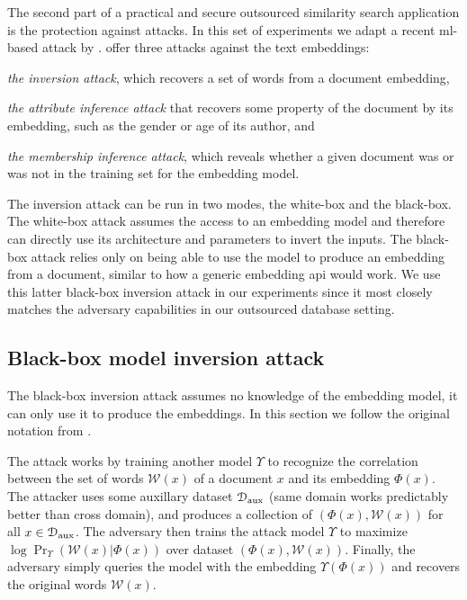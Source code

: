		The second part of a practical and secure outsourced similarity search application is the protection against attacks.
		In this set of experiments we adapt a recent \acrshort{ml}-based attack by \textcite{embedding-attacks}.
		\textcite{embedding-attacks} offer three attacks against the text embeddings:
		\begin{enumerate*}[label={(\roman*)}]
			\item \emph{the inversion attack}, which recovers a set of words from a document embedding,
			\item \emph{the attribute inference attack} that recovers some property of the document by its embedding, such as the gender or age of its author, and
			\item \emph{the membership inference attack}, which reveals whether a given document was or was not in the training set for the embedding model.
		\end{enumerate*}
		The inversion attack can be run in two modes, the white-box and the black-box.
		The white-box attack assumes the access to an embedding model and therefore can directly use its architecture and parameters to invert the inputs.
		The black-box attack relies only on being able to use the model to produce an embedding from a document, similar to how a generic embedding \acrshort{api} would work.
		We use this latter black-box inversion attack in our experiments since it most closely matches the adversary capabilities in our outsourced database setting.

		\subsection{Black-box model inversion attack \texorpdfstring{\cite{embedding-attacks}}{}}

			The black-box inversion attack assumes no knowledge of the embedding model, it can only use it to produce the embeddings.
			In this section we follow the original notation from \cite{embedding-attacks}.

			The attack works by training another model $\Upsilon$ to recognize the correlation between the set of words $\mathcal{W}(x)$ of a document $x$ and its embedding $\Phi(x)$.
			The attacker uses some auxillary dataset $\mathcal{D}_\text{aux}$ (same domain works predictably better than cross domain), and produces a collection of $ ( \Phi(x), \mathcal{W}(x) ) $ for all $x \in \mathcal{D}_\text{aux}$.
			The adversary then trains the attack model $\Upsilon$ to maximize $ \log \Pr_\Upsilon ( \mathcal{W}(x) | \Phi(x) ) $ over dataset $ ( \Phi(x), \mathcal{W}(x) ) $.
			Finally, the adversary simply queries the model with the embedding $ \Upsilon( \Phi( x ) ) $ and recovers the original words $\mathcal{W}(x)$.

